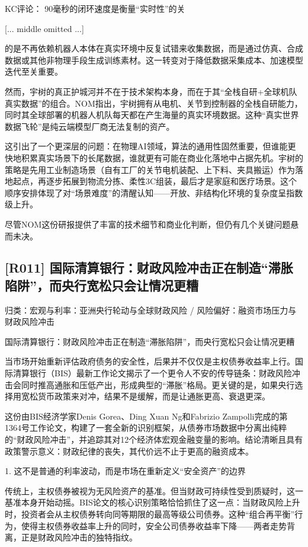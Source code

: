 \documentclass[11pt]{ctexart}
\begin{document}
KC评论： 90毫秒的闭环速度是衡量“实时性”的关

[... middle omitted ...]

的是不再依赖机器人本体在真实环境中反复试错来收集数据，而是通过仿真、合成数据或其他非物理手段生成训练素材。这一转变对于降低数据采集成本、加速模型迭代至关重要。

然而，宇树的真正护城河并不在于技术架构本身，而在于其“全栈自研+全球机队真实数据”的组合。NOM指出，宇树拥有从电机、关节到控制器的全栈自研能力，同时其全球部署的机器人机队每天都在产生海量的真实环境数据。这种“真实世界数据飞轮”是纯云端模型厂商无法复制的资产。

这引出了一个更深层的问题：在物理AI领域，算法的通用性固然重要，但谁能更快地积累真实场景下的长尾数据，谁就更有可能在商业化落地中占据先机。宇树的策略是先用工业制造场景（自有工厂的关节电机装配、上下料、夹具搬运）作为落地起点，再逐步拓展到物流分拣、柔性3C组装，最后才是家庭和医疗场景。这个顺序安排体现了对“场景难度”的清醒认知——开放、非结构化环境的复杂度呈指数级上升。

尽管NOM这份研报提供了丰富的技术细节和商业化判断，但仍有几个关键问题悬而未决。

\subsection{[R011] 国际清算银行：财政风险冲击正在制造“滞胀陷阱”，而央行宽松只会让情况更糟}
{\small\color{refgray}归类：宏观与利率：亚洲央行轮动与全球财政风险 / 风险偏好：融资市场压力与财政风险冲击}

国际清算银行：财政风险冲击正在制造“滞胀陷阱”，而央行宽松只会让情况更糟

当市场开始重新评估政府债务的安全性，后果并不仅仅是主权债券收益率上行。国际清算银行（BIS）最新工作论文揭示了一个更令人不安的传导链条：财政风险冲击会同时推高通胀和压低产出，形成典型的“滞胀”格局。更关键的是，如果央行选择用宽松货币政策来对冲，结果不是缓解，而是让通胀更高、衰退更深。

这份由BIS经济学家Denis Gorea、Ding Xuan Ng和Fabrizio Zampolli完成的第1364号工作论文，构建了一套全新的识别框架，从债券市场数据中分离出纯粹的“财政风险冲击”，并追踪其对12个经济体宏观金融变量的影响。结论清晰且具有政策警示意义：财政纪律的丧失，其代价远不止于更高的融资成本。

1. 这不是普通的利率波动，而是市场在重新定义“安全资产”的边界

传统上，主权债券被视为无风险资产的基准。但当财政可持续性受到质疑时，这一基准本身开始动摇。BIS论文的核心识别策略恰恰抓住了这一点：当财政风险上升时，投资者会从主权债券转向同等期限的最高等级公司债券。这种“组合再平衡”行为，使得主权债券收益率上升的同时，安全公司债券收益率下降——两者走势背离，正是财政风险冲击的独特指纹。
\end{document}
